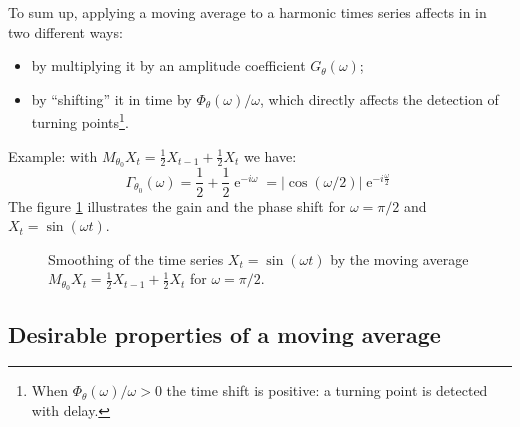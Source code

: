 \documentclass[
  12pt,
  ,
  a4paper]{article}
\DeclareMathOperator{\e}{e}
\newcommand\1{\mathds{1}}
\begin{document}
To sum up, applying a moving average to a harmonic times series affects in in two different ways:

\begin{itemize}
\item
  by multiplying it by an amplitude coefficient \(G_{\theta}\left(\omega\right)\);
\item
  by ``shifting'' it in time by \(\Phi_\theta(\omega)/\omega\), which directly affects the detection of turning points\footnote{When \(\Phi_\theta(\omega)/\omega>0\) the time shift is positive: a turning point is detected with delay.}.
\end{itemize}

Example: with \(M_{\theta_0}X_t=\frac{1}{2}X_{t-1}+\frac{1}{2}X_{t}\) we have:
\[
\Gamma_{\theta_0}(\omega)=\frac{1}{2}+\frac{1}{2}\e^{-i\omega}
=\lvert\cos(\omega/2)\rvert\e^{-i\frac{\omega}{2}}
\]
The figure \ref{fig:exgainPhase} illustrates the gain and the phase shift for \(\omega=\pi/2\) and \(X_t=\sin(\omega t)\).

\begin{figure}[!ht]
\caption{Smoothing of the time series $X_t=\sin(\omega t)$ by the moving average $M_{\theta_0}X_t=\frac{1}{2}X_{t-1}+\frac{1}{2}X_{t}$ for $\omega=\pi/2$.}\label{fig:exgainPhase}
\end{figure}

\hypertarget{desirable-properties-of-a-moving-average}{%
\subsection{Desirable properties of a moving average}\label{desirable-properties-of-a-moving-average}}
\end{document}
